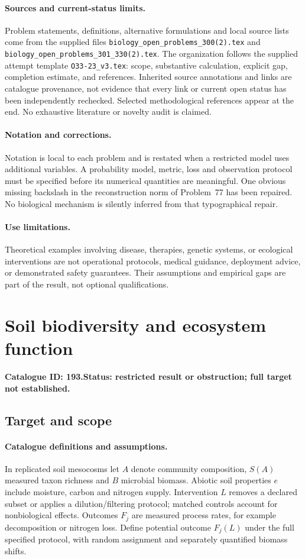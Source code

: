 \documentclass[11pt]{article}
\begin{document}
\paragraph{Sources and current-status limits.}
Problem statements, definitions, alternative formulations and local source lists
come from the supplied files
\texttt{biology\_open\_problems\_300(2).tex} and
\texttt{biology\_open\_problems\_301\_330(2).tex}.
The organization follows the supplied attempt template
\texttt{O33-23\_v3.tex}: scope, substantive calculation, explicit gap,
completion estimate, and references. Inherited source annotations and links are
catalogue provenance, not evidence that every link or current open status has
been independently rechecked. Selected methodological references appear at the
end. No exhaustive literature or novelty audit is claimed.

\paragraph{Notation and corrections.}
Notation is local to each problem and is restated when a restricted model uses
additional variables. A probability model, metric, loss and observation protocol
must be specified before its numerical quantities are meaningful. One obvious
missing backslash in the reconstruction norm of Problem~77 has been repaired.
No biological mechanism is silently inferred from that typographical repair.

\paragraph{Use limitations.}
Theoretical examples involving disease, therapies, genetic systems, or ecological
interventions are not operational protocols, medical guidance, deployment advice,
or demonstrated safety guarantees. Their assumptions and empirical gaps are part
of the result, not optional qualifications.

\setcounter{section}{192}
\section{Soil biodiversity and ecosystem function}
\label{prob:193}
\noindent\textbf{Catalogue ID: 193.}\quad \textbf{Status: restricted result or obstruction; full target not established.}
\subsection{Target and scope}
\paragraph{Catalogue definitions and assumptions.}
In replicated soil mesocosms let $A$ denote community composition, $S(A)$ measured taxon richness and $B$ microbial biomass. Abiotic soil properties $e$ include moisture, carbon and nitrogen supply. Intervention $L$ removes a declared subset or applies a dilution/filtering protocol; matched controls account for nonbiological effects. Outcomes $F_j$ are measured process rates, for example decomposition or nitrogen loss. Define potential outcome $F_j(L)$ under the full specified protocol, with random assignment and separately quantified biomass shifts.
\end{document}
